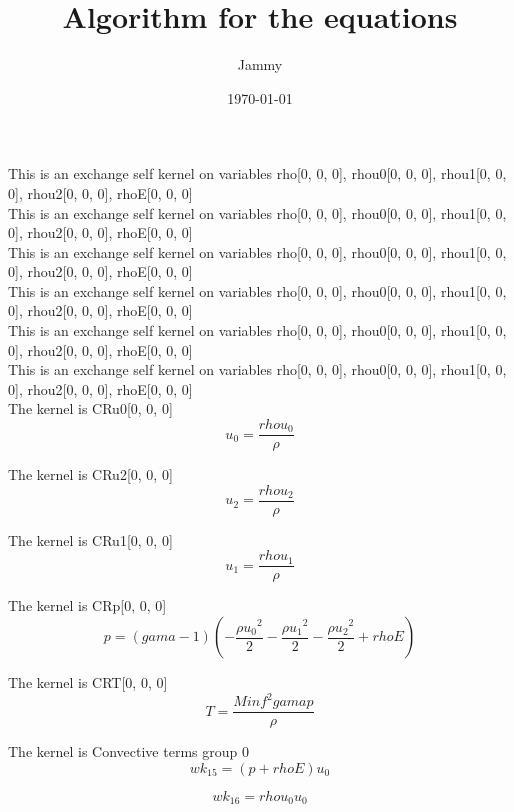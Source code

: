 \documentclass{article}
\title{Algorithm for the equations}
\author{Jammy\\ }
\date{\today}
\begin{document}
\maketitle
This is an exchange self kernel on variables rho[0, 0, 0], rhou0[0, 0, 0], rhou1[0, 0, 0], rhou2[0, 0, 0], rhoE[0, 0, 0]\\This is an exchange self kernel on variables rho[0, 0, 0], rhou0[0, 0, 0], rhou1[0, 0, 0], rhou2[0, 0, 0], rhoE[0, 0, 0]\\This is an exchange self kernel on variables rho[0, 0, 0], rhou0[0, 0, 0], rhou1[0, 0, 0], rhou2[0, 0, 0], rhoE[0, 0, 0]\\This is an exchange self kernel on variables rho[0, 0, 0], rhou0[0, 0, 0], rhou1[0, 0, 0], rhou2[0, 0, 0], rhoE[0, 0, 0]\\This is an exchange self kernel on variables rho[0, 0, 0], rhou0[0, 0, 0], rhou1[0, 0, 0], rhou2[0, 0, 0], rhoE[0, 0, 0]\\This is an exchange self kernel on variables rho[0, 0, 0], rhou0[0, 0, 0], rhou1[0, 0, 0], rhou2[0, 0, 0], rhoE[0, 0, 0]\\The kernel is CRu0[0, 0, 0]\begin{dmath}{u_{0}} = \frac{{rhou_{0}}}{{\rho}}\end{dmath}

The kernel is CRu2[0, 0, 0]\begin{dmath}{u_{2}} = \frac{{rhou_{2}}}{{\rho}}\end{dmath}

The kernel is CRu1[0, 0, 0]\begin{dmath}{u_{1}} = \frac{{rhou_{1}}}{{\rho}}\end{dmath}

The kernel is CRp[0, 0, 0]\begin{dmath}{p} = \left(gama - 1\right) \left(- \frac{{\rho} 
{{u_{0}}}^{2}}{2} - \frac{{\rho} {{u_{1}}}^{2}}{2} - \frac{{\rho} 
{{u_{2}}}^{2}}{2} + {rhoE}\right)\end{dmath}

The kernel is CRT[0, 0, 0]\begin{dmath}{T} = \frac{{Minf}^{2} gama {p}}{{\rho}}\end{dmath}

The kernel is Convective terms group 0\begin{dmath}{wk_{15}} = \left({p} + {rhoE}\right) {u_{0}}\end{dmath}

\begin{dmath}{wk_{16}} = {rhou_{0}} {u_{0}}\end{dmath}
\end{document}
